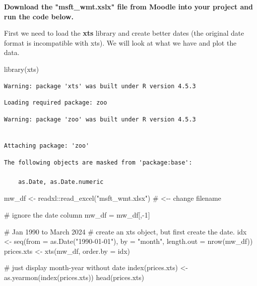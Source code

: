 \documentclass[
  a4paper,
  DIV=11,
  numbers=noendperiod]{scrartcl}
\newenvironment{Shaded}{\begin{snugshade}}{\end{snugshade}}
\newcommand{\AttributeTok}[1]{\textcolor[rgb]{0.40,0.45,0.13}{#1}}
\newcommand{\CommentTok}[1]{\textcolor[rgb]{0.37,0.37,0.37}{#1}}
\newcommand{\DecValTok}[1]{\textcolor[rgb]{0.68,0.00,0.00}{#1}}
\newcommand{\FunctionTok}[1]{\textcolor[rgb]{0.28,0.35,0.67}{#1}}
\newcommand{\NormalTok}[1]{\textcolor[rgb]{0.00,0.23,0.31}{#1}}
\newcommand{\OtherTok}[1]{\textcolor[rgb]{0.00,0.23,0.31}{#1}}
\newcommand{\SpecialCharTok}[1]{\textcolor[rgb]{0.37,0.37,0.37}{#1}}
\newcommand{\StringTok}[1]{\textcolor[rgb]{0.13,0.47,0.30}{#1}}
\begin{document}
\textcolor{awesome}{\textbf{Download the "msft\_wmt.xslx" file from Moodle into your project and run the code below.}}

\textcolor{awesome}{First we need to load the \textbf{xts} library and create better dates (the original date format is incompatible with xts). We will look at what we have and plot the data.}

\begin{Shaded}
\begin{Highlighting}[]
\FunctionTok{library}\NormalTok{(xts)}
\end{Highlighting}
\end{Shaded}

\begin{verbatim}
Warning: package 'xts' was built under R version 4.5.3
\end{verbatim}

\begin{verbatim}
Loading required package: zoo
\end{verbatim}

\begin{verbatim}
Warning: package 'zoo' was built under R version 4.5.3
\end{verbatim}

\begin{verbatim}

Attaching package: 'zoo'
\end{verbatim}

\begin{verbatim}
The following objects are masked from 'package:base':

    as.Date, as.Date.numeric
\end{verbatim}

\begin{Shaded}
\begin{Highlighting}[]
\NormalTok{mw\_df }\OtherTok{\textless{}{-}}\NormalTok{ readxl}\SpecialCharTok{::}\FunctionTok{read\_excel}\NormalTok{(}\StringTok{"msft\_wmt.xlsx"}\NormalTok{)   }\CommentTok{\# \textless{}{-}{-} change filename}

\CommentTok{\# ignore the date column}
\NormalTok{mw\_df }\OtherTok{=}\NormalTok{ mw\_df[,}\SpecialCharTok{{-}}\DecValTok{1}\NormalTok{]}

\CommentTok{\# Jan 1990 to March 2024}
\CommentTok{\# create an xts object, but first create the date. }
\NormalTok{idx }\OtherTok{\textless{}{-}} \FunctionTok{seq}\NormalTok{(}\AttributeTok{from =} \FunctionTok{as.Date}\NormalTok{(}\StringTok{"1990{-}01{-}01"}\NormalTok{), }\AttributeTok{by =} \StringTok{"month"}\NormalTok{, }\AttributeTok{length.out =} \FunctionTok{nrow}\NormalTok{(mw\_df))}
\NormalTok{prices.xts }\OtherTok{\textless{}{-}} \FunctionTok{xts}\NormalTok{(mw\_df, }\AttributeTok{order.by =}\NormalTok{ idx)}

\CommentTok{\# just display month{-}year without date}
\FunctionTok{index}\NormalTok{(prices.xts) }\OtherTok{\textless{}{-}} \FunctionTok{as.yearmon}\NormalTok{(}\FunctionTok{index}\NormalTok{(prices.xts))  }
\FunctionTok{head}\NormalTok{(prices.xts)}
\end{Highlighting}
\end{Shaded}
\end{document}
